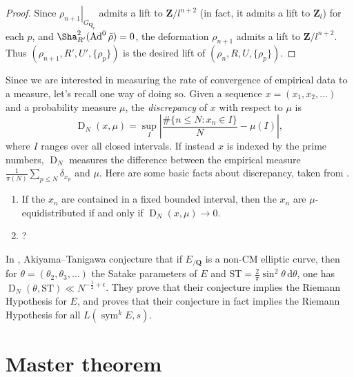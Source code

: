 \documentclass{article}
\DeclareMathOperator{\Ad}{Ad}
\DeclareMathOperator{\D}{D}
\DeclareMathOperator{\sym}{sym}
\newcommand{\bQ}{\mathbf{Q}}
\newcommand{\bZ}{\mathbf{Z}}
\newcommand{\dd}{\mathrm{d}}
\newcommand{\ST}{\mathrm{ST}}
\begin{document}
\begin{proof}
Since $\left.\rho_{n+1}\right|_{G_{\bQ_p}}$ admits a lift to $\bZ/l^{n+2}$ (in 
fact, it admits a lift to $\bZ_l$) for each $p$, and 
$\Sha_{R'}^2(\Ad^0\bar\rho) = 0$, the deformation $\rho_{n+1}$ admits a lift to 
$\bZ/l^{n+2}$. Thus $(\rho_{n+1},R',U',\{\rho_p\})$ is the desired lift of 
$(\rho_n,R,U,\{\rho_p\})$. 
\end{proof}

Since we are interested in measuring the rate of convergence of empirical data 
to a measure, let's recall one way of doing so. Given a sequence 
$x=(x_1,x_2,\dots)$ and a probability measure $\mu$, the \emph{discrepancy} of 
$x$ with respect to $\mu$ is 
\[
	\D_N(x,\mu) = \sup_I \left| \frac{\# \{n\leqslant N : x_n \in I\}}{N} - \mu(I)\right| ,
\]
where $I$ ranges over all closed intervals. If instead $x$ is indexed by the 
prime numbers, $\D_N$ measures the difference between the empirical measure 
$\frac{1}{\pi(N)} \sum_{p\leqslant N} \delta_{x_p}$ and $\mu$. Here are some 
basic facts about discrepancy, taken from \cite{kn}. 
\begin{enumerate}
\item
If the $x_n$ are contained in a fixed bounded interval, then the $x_n$ are 
$\mu$-equidistributed if and only if $\D_N(x,\mu) \to 0$. 

\item
?
\end{enumerate}

In \cite{at}, Akiyama--Tanigawa conjecture that if $E_{/\bQ}$ is a non-CM 
elliptic curve, then for $\theta = (\theta_2,\theta_3,\dots)$ the Satake 
parameters of $E$ and $\ST = \frac{2}{\pi}\sin^2\theta\, \dd\theta$, one has 
$\D_N(\theta,\ST) \ll N^{-\frac 1 2+\epsilon}$. They prove that their 
conjecture implies the Riemann Hypothesis for $E$, and \cite{mazur} proves 
that their conjecture in fact implies the Riemann Hypothesis for all 
$L(\sym^k E,s)$.





\section{Master theorem}
\end{document}
